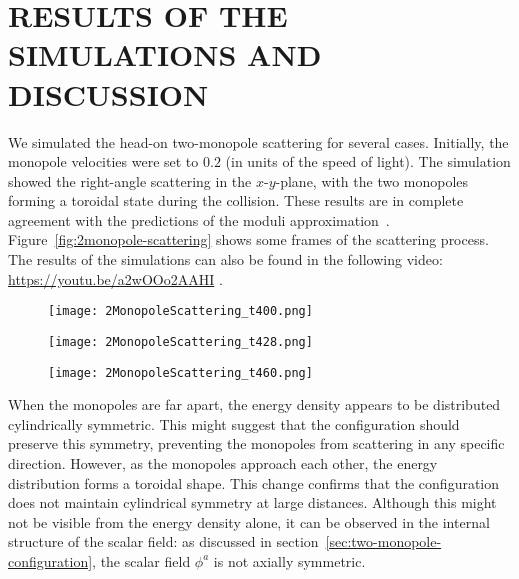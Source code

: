 \documentclass[aps, prd, twocolumn, superscriptaddress, preprintnumbers, nofootinbib, longbibliography]{revtex4-1}
\begin{document}
\section{\MakeUppercase{Results of the Simulations and Discussion}}
\label{sec:results}
We simulated the head-on two-monopole scattering for several cases. Initially, the monopole velocities were set to $0.2$ (in units of the speed of light). The simulation showed the right-angle scattering in the $x$-$y$-plane, with the two monopoles forming a toroidal state during the collision. These results are in complete agreement with the predictions of the moduli approximation~\cite{Atiyah-Hitchin1988}. Figure~\ref{fig:2monopole-scattering} shows some frames of the scattering process. The results of the simulations can also be found in the following video:\\
\url{https://youtu.be/a2wOOo2AAHI} .

\begin{figure*}
  \centering
  \begin{subfigure}{0.3\textwidth}
    \texttt{[image: 2MonopoleScattering\_t400.png]}
  \end{subfigure}
  \hspace{\fill}
  \begin{subfigure}{0.3\textwidth}
    \texttt{[image: 2MonopoleScattering\_t428.png]}
  \end{subfigure}
  \hspace{\fill}
  \begin{subfigure}{0.3\textwidth}
    \texttt{[image: 2MonopoleScattering\_t460.png]}
  \end{subfigure}
  \caption{These contour plots show three frames for the energy densities bigger than $0.06 m_v^4/g^2$ for the two monopoles right-angle scattering. As we can see, the energy density forms a toroidal structure during the scattering process.  The length and time values are given in units of $m_v^{-1}$.}
  \label{fig:2monopole-scattering}
\end{figure*} 

When the monopoles are far apart, the energy density appears to be distributed cylindrically symmetric. This might suggest that the configuration should preserve this symmetry, preventing the monopoles from scattering in any specific direction. However, as the monopoles approach each other, the energy distribution forms a toroidal shape. This change confirms that the configuration does not maintain cylindrical symmetry at large distances.
Although this might not be visible from the energy density alone, it can be observed in the internal structure of the scalar field: as discussed in section~\ref{sec:two-monopole-configuration}, the scalar field $\phi^a$ is not axially symmetric.
\end{document}
